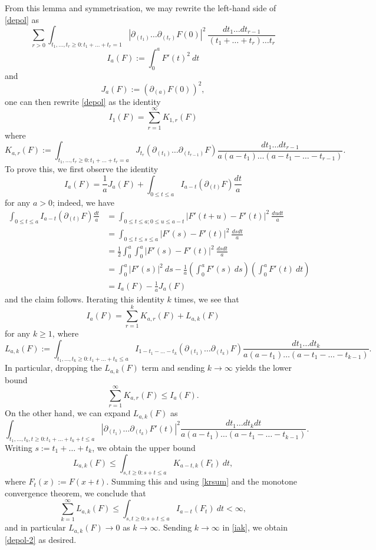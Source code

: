 From this lemma and symmetrisation, we may rewrite the left-hand side of \eqref{depol} as
$$
 \sum_{r>0} \int_{t_1,\dots,t_r \geq 0: t_1+\dots+t_r =1} |\partial_{(t_1)} \dots \partial_{(t_r)} F(0)|^2\ \frac{dt_1 \dots dt_{r-1}}{(t_1+\dots+t_r) \dots t_r}$$
$$ I_a(F) := \int_0^a F'(t)^2\ dt$$
and
$$ J_a(F) := (\partial_{(a)} F(0))^2,$$
one can then rewrite \eqref{depol} as the identity
\begin{equation}\label{depol-2}
 I_1(F) = \sum_{r=1}^\infty K_{1,r}(F)
\end{equation}
where
$$ K_{a,r}(F) := \int_{t_1,\dots,t_r \geq 0: t_1+\dots+t_r =a} J_{t_r}( \partial_{(t_1)} \dots \partial_{(t_{r-1})} F) \frac{dt_1 \dots dt_{r-1}}{a(a-t_1) \dots (a-t_1-\dots-t_{r-1})}.$$
To prove this, we first observe the identity
$$ I_a(F) = \frac{1}{a} J_a(F) + \int_{0 \leq t \leq a} I_{a-t}( \partial_{(t)} F ) \frac{dt}{a}$$
for any $a>0$; indeed, we have
\begin{align*}
\int_{0 \leq t \leq a} I_{a-t}( \partial_{(t)} F ) \frac{dt}{a} &=
\int_{0 \leq t \leq a; 0 \leq u \leq a-t} |F'(t+u) - F'(t)|^2\ \frac{du dt}{a} \\
&= \int_{0 \leq t \leq s \leq a} |F'(s) - F'(t)|^2\ \frac{ds dt}{a} \\
&= \frac{1}{2} \int_0^a \int_0^a |F'(s) - F'(t)|^2\ \frac{ds dt}{a} \\
&= \int_0^a |F'(s)|^2\ ds - \frac{1}{a} (\int_0^a F'(s)\ ds) (\int_0^a F'(t)\ dt) \\
&= I_a(F) - \frac{1}{a} J_a(F)
\end{align*}
and the claim follows.  Iterating this identity $k$ times, we see that
\begin{equation}\label{iak}
I_a(F) = \sum_{r=1}^k K_{a,r}(F) + L_{a,k}(F)
\end{equation}
for any $k \geq 1$, where
$$ L_{a,k}(F) := \int_{t_1,\dots,t_k \geq 0: t_1+\dots+t_k \leq a} I_{1-t_1-\dots-t_k}( \partial_{(t_1)} \dots \partial_{(t_k)} F) \frac{dt_1 \dots dt_k}{a(a-t_1) \dots (a-t_1-\dots-t_{k-1})}.$$
In particular, dropping the $L_{a,k}(F)$ term and sending $k \to \infty$ yields the lower bound
\begin{equation}\label{krsum}
\sum_{r=1}^\infty K_{a,r}(F) \leq I_a(F).
\end{equation}
On the other hand, we can expand $L_{a,k}(F)$ as
$$ \int_{t_1,\dots,t_k,t \geq 0: t_1+\dots+t_k+t \leq a} |\partial_{(t_1)} \dots \partial_{(t_k)} F'(t)|^2 \frac{dt_1 \dots dt_k dt}{a(a-t_1) \dots (a-t_1-\dots-t_{k-1})}.$$
Writing $s := t_1 + \dots + t_k$, we obtain the upper bound
$$ L_{a,k}(F) \leq \int_{s,t \geq 0: s+t \leq a} K_{a-t,k}( F_t )\ dt,$$
where $F_t(x) := F(x+t)$.  Summing this and using \eqref{krsum} and the monotone convergence theorem, we conclude that
$$ \sum_{k=1}^\infty L_{a,k}(F) \leq \int_{s,t \geq 0: s+t \leq a} I_{a-t}( F_t )\ dt < \infty,$$
and in particular $L_{a,k}(F) \to 0$ as $k \to \infty$.  Sending $k \to \infty$ in \eqref{iak}, we obtain \eqref{depol-2} as desired.

